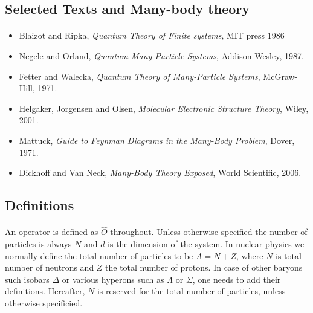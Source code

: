 \documentclass[%
twoside,                 %
final,                   %
10pt]{article}
\begin{document}
\noindent



\subsection{Selected Texts and Many-body theory}

\paragraph{}
\begin{itemize}
\item Blaizot and Ripka, \emph{Quantum Theory of Finite systems}, MIT press 1986

\item Negele and Orland, \emph{Quantum Many-Particle Systems}, Addison-Wesley, 1987.

\item Fetter and Walecka, \emph{Quantum Theory of Many-Particle Systems}, McGraw-Hill, 1971.

\item Helgaker, Jorgensen and Olsen, \emph{Molecular Electronic Structure Theory}, Wiley, 2001.

\item Mattuck, \emph{Guide to Feynman Diagrams in the Many-Body Problem}, Dover, 1971.

\item Dickhoff and Van Neck, \emph{Many-Body Theory Exposed}, World Scientific, 2006.
\end{itemize}

\noindent




\subsection{Definitions}

\paragraph{}
An operator is defined as $\hat{O}$ throughout. Unless otherwise specified the number of particles is
always $N$ and $d$ is the dimension of the system.  In nuclear physics
we normally define the total number of particles to be $A=N+Z$, where
$N$ is total number of neutrons and $Z$ the total number of
protons. In case of other baryons such isobars $\Delta$ or various
hyperons such as $\Lambda$ or $\Sigma$, one needs to add their
definitions.  Hereafter, $N$ is reserved for the total number of
particles, unless otherwise specificied.
\end{document}
